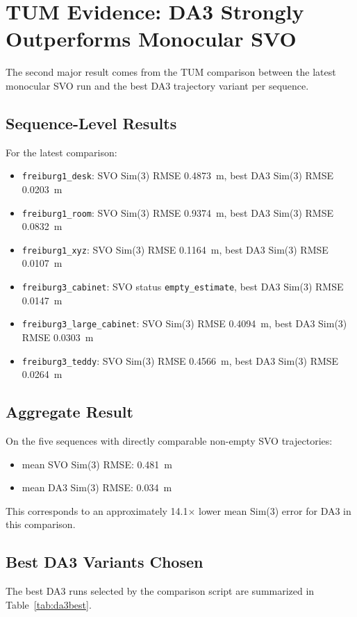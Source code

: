 \documentclass[conference]{IEEEtran}
\begin{document}
\section{TUM Evidence: DA3 Strongly Outperforms Monocular SVO}
The second major result comes from the TUM comparison between the latest monocular SVO run and the best DA3 trajectory variant per sequence.

\subsection{Sequence-Level Results}
For the latest comparison:
\begin{itemize}
\item \texttt{freiburg1\_desk}: SVO Sim(3) RMSE 0.4873~m, best DA3 Sim(3) RMSE 0.0203~m
\item \texttt{freiburg1\_room}: SVO Sim(3) RMSE 0.9374~m, best DA3 Sim(3) RMSE 0.0832~m
\item \texttt{freiburg1\_xyz}: SVO Sim(3) RMSE 0.1164~m, best DA3 Sim(3) RMSE 0.0107~m
\item \texttt{freiburg3\_cabinet}: SVO status \texttt{empty\_estimate}, best DA3 Sim(3) RMSE 0.0147~m
\item \texttt{freiburg3\_large\_cabinet}: SVO Sim(3) RMSE 0.4094~m, best DA3 Sim(3) RMSE 0.0303~m
\item \texttt{freiburg3\_teddy}: SVO Sim(3) RMSE 0.4566~m, best DA3 Sim(3) RMSE 0.0264~m
\end{itemize}

\subsection{Aggregate Result}
On the five sequences with directly comparable non-empty SVO trajectories:
\begin{itemize}
\item mean SVO Sim(3) RMSE: 0.481~m
\item mean DA3 Sim(3) RMSE: 0.034~m
\end{itemize}

This corresponds to an approximately 14.1$\times$ lower mean Sim(3) error for DA3 in this comparison.

\subsection{Best DA3 Variants Chosen}
The best DA3 runs selected by the comparison script are summarized in Table~\ref{tab:da3best}.
\end{document}
